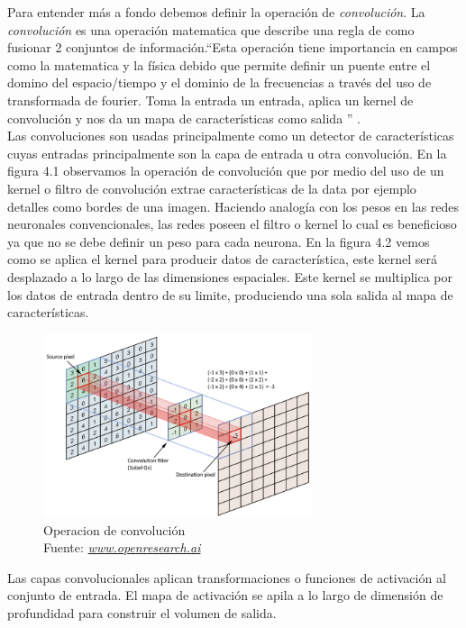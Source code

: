 Para entender más a fondo debemos definir la operación de \textit{convolución}.  La \textit{convolución} es una operación matematica que describe una regla de como fusionar 2 conjuntos de información.\textquotedblleft Esta operación tiene importancia en campos como la matematica y la física debido que permite definir un puente entre el domino del espacio/tiempo y el dominio de la frecuencias a través del uso de transformada de fourier. Toma la entrada un entrada, aplica un kernel de convolución y nos da un mapa de características como salida \textquotedblright \cite{book1} .\\
Las convoluciones son usadas principalmente como un detector de características cuyas entradas principalmente son la capa de entrada u otra convolución.
En la figura 4.1 observamos la operación de convolución que por medio del uso de un kernel o filtro de convolución extrae características de la data por ejemplo detalles como bordes de una imagen. Haciendo analogía con los pesos en las redes neuronales convencionales, las redes poseen el filtro o kernel lo cual es beneficioso ya que no se debe definir un peso para cada neurona. En la figura 4.2 vemos como se aplica el kernel para producir datos de característica, este kernel será desplazado a lo largo de las dimensiones espaciales. Este kernel se multiplica por los datos de entrada dentro de su limite, produciendo una sola salida al mapa de características.
\begin{figure}[H]
	\centering
	\includegraphics[width=0.7\textwidth]{Figures/convolucion.jpeg}
	\caption{Operacion de convolución \\ Fuente:  \href{http://openresearch.ai/t/network-in-network/39}{\textit{www.openresearch.ai}}}
	\label{convolucion}
\end{figure} 

Las capas convolucionales aplican transformaciones o funciones de activación al conjunto de entrada. El mapa de activación se apila a lo largo de dimensión de profundidad para construir el volumen de salida.

